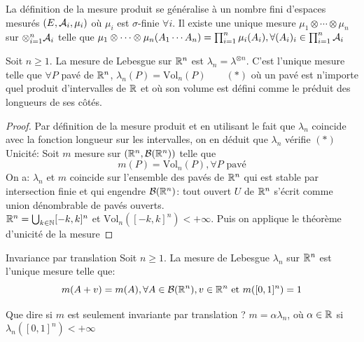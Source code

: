 \documentclass[]{report}
\begin{document}
    \begin{re}{}{}
        La définition de la mesure produit se généralise à un nombre fini d'espaces mesurés $(E,\mathcal{A}_i,\mu_i)$ où $\mu_i$ est $\sigma$-finie $\forall i$. Il existe une unique mesure $\mu_1\otimes\cdots\otimes \mu_n$ sur $\otimes_{i=1}^n\mathcal{A}_i$ telle que $\mu_1\otimes \cdots \otimes \mu_n(A_1\cdots A_n)=\prod_{i=1}^{n}\mu_i(A_i),\forall (A_i)_i\in\prod_{i=1}^{n}\mathcal{A}_i$
    \end{re}

    \begin{df}{}{}
        Soit $n\ge 1$. La mesure de Lebesgue sur $\mathbb{R}^n$ est $\lambda_n=\lambda^{\otimes n}$. C'est l'unique mesure telle que $\forall P$ pavé de $\mathbb{R}^n$, $\lambda_n(P)=\text{Vol}_n(P)\qquad (*)$ où un pavé est n'importe quel produit d'intervalles de $\mathbb{R}$ et où son volume est défini comme le préduit des longueurs de ses côtés.
    \end{df}

    \begin{proof}
        Par définition de la mesure produit et en utilisant le fait que $\lambda_n$ coincide avec la fonction longueur sur les intervalles, on en déduit que $\lambda_n$ vérifie $(*)$\\
        Unicité: Soit $m$ mesure sur $(\mathbb{R}^n,\mathcal{B}(\mathbb{R}^n))$ telle que 
        \[m(P)=\text{Vol}_n(P),\forall P\text{ pavé}\]
        On a: $\lambda_n$ et $m$ coincide sur l'ensemble des pavés de $\mathbb{R}^n$ qui est stable par intersection finie et qui engendre $\mathcal{B}(\mathbb{R}^n)$: tout ouvert $U$ de $\mathbb{R}^n$ s'écrit comme union dénombrable de pavés ouverts.\\
        $\mathbb{R}^n=\bigcup_{k\in\mathbb{N}}[-k,k]^n$ et $\text{Vol}_n([-k,k]^n)<+\infty$. Puis on applique le théorème d'unicité de la mesure
    \end{proof}

    \begin{prop}{Invariance par translation}{}
        Soit $n\ge 1$. La mesure de Lebesgue $\lambda_n$ sur $\mathbb{R}^n$ est l'unique mesure telle que:
        \[m(A+v)=m(A),\forall A\in\mathcal{B}(\mathbb{R}^n),v\in\mathbb{R}^n\text{ et }m([0,1]^n)=1\]
    \end{prop}

    \begin{exo}{}{}
        Que dire si $m$ est seulement invariante par translation ? $m=\alpha\lambda_n$, où $\alpha\in\mathbb{R}$ si $\lambda_n([0,1]^n)<+\infty$
    \end{exo}
\end{document}
